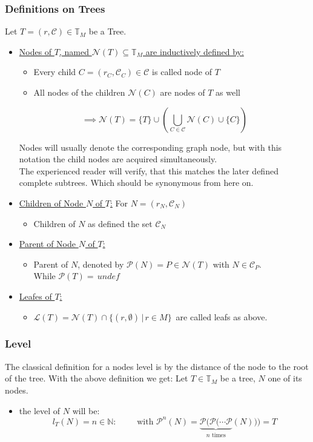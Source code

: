 \documentclass[a4paper,12pt]{article}
\theoremstyle{definition}
\begin{document}
		\subsubsection{Definitions on Trees}
		Let $T=(r,\mathcal{C})\in \mathds{T}_M$ be a Tree.
		\begin{itemize}
			\item \underline{Nodes of $T$, named $\mathcal{N}(T)\subseteq \mathds{T}_M$ are inductively defined by:}
			\begin{itemize}
				\item Every child $C=(r_C,\mathcal{C}_C)\in \mathcal{C}$ is called node of $T$
				\item  All nodes of the children $\mathcal{N}(C)$ are nodes of $T$ as well
			\end{itemize}
			\[\implies \mathcal{N}(T)=\{T\}\cup\left (\bigcup_{C\in\mathcal{C}} \mathcal{N}(C) \cup \{C\}\right)\]
			
			Nodes will usually denote the corresponding graph node, but with this notation the child nodes are acquired simultaneously. \\The experienced reader will verify, that this matches the later defined complete subtrees. Which should be synonymous from here on.
			\item \underline{Children of Node $N$ of $T$:}
			For $N=(r_N, \mathcal{C}_N)$
			\begin{itemize}
				\item Children of $N$ as defined the set $\mathcal{C}_N$
			\end{itemize}
			\item \underline{Parent of Node $N$ of $T$:}
				\begin{itemize}
					\item Parent of $N$, denoted by $\mathcal{P}(N)=P\in \mathcal{N}(T)$ with $N\in \mathcal{C}_P$.\\
					While $\mathcal{P}(T)=\,undef$
				\end{itemize}
			\item \underline{Leafes of $T$:}
				\begin{itemize}
					\item $\mathcal{L}(T)= \mathcal{N}(T) \cap \{(r,\emptyset)\,\vert\, r\in M\}\,$ are called leafs as above.
				\end{itemize}
		\end{itemize}
		\subsubsection{Level}
		The classical definition for  a nodes level is by the distance of the node to the root of the tree.
		With the above definition we get:
		Let $T\in\mathds{T}_M$ be a tree, $N$ one of its nodes.  
		\begin{itemize}
			\item the level of $N$ will be: \[l_T(N)=n\in \mathds{N}:\qquad\text{ with } \mathcal{P}^{n}(N)=\underbrace{\mathcal{P}(\mathcal{P}(\cdots \mathcal{P}}_{n\text{ times}}(N)))=T \]
		\end{itemize}
\end{document}
